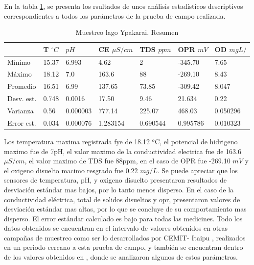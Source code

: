 En la tabla \ref{tab:datos Lago}, se presenta los rsultados de unos an\'alisis estadísticos descriptivos correspondientes a todos los par\'ametros de la prueba de campo realizada.

\begin{table}[H]
\caption{Muestreo lago Ypakarai. Resumen}
\label{tab:datos Lago}
\begin{tabular}{lllllll} \hline& 
T  $^{\circ}C$ & $pH$     & CE $\mu S/cm$ & TDS $ppm$ & OPR $mV$ & OD $mgL/$  \\ \hline
M\'inimo & 15.37 & 6.993 & 4.62 & 2    & -345.70  & 7.65     \\
M\'aximo & 18.12 & 7.0   & 163.6    & 88    & -269.10  & 8.43 \\
Promedio & 16.51  & 6.99 & 137.65 & 73.85 & -309.42  & 8.047 \\
Desv. est. & 0.748 & 0.0016   & 17.50   & 9.46     & 21.634   & 0.22     \\
Varianza                & 0.56           & 0.000003 & 777.14        & 225.07    & 468.03   & 0.050296 \\
Error est.               & 0.034 & 0.000076 & 1.283154 & 0.690544 & 0.995786 & 0.010323 \\
\hline
\end{tabular}
\end{table}
Los temperatura maxima registrada fye de 18.12 $^o$C, el potencial de hidrigeno maximo fue de 7pH, el valor maximo de la conductividad electrica fue de 163.6 $\mu S/cm$, el valor maximo de TDS fue 88ppm, en el caso de OPR fue -269.10 $mV$ y el oxigeno disuelto macimo resgrado fue 0.22 $mg/L$.
Se puede apreciar que los sensores de temperatura, pH, y oxigeno disuelto presentaron resultados de desviación estándar mas bajos, por lo tanto menos disperso. En el caso de la conductividad eléctrica, total de solidos disueltos y opr, presentaron valores de desviación estándar mas altas, por lo que se concluye de su comportamiento mas disperso.
El error estándar calculado es bajo para todas las medicines. 
Todo los datos obtenidos se encuentran en el intervalo de valores obtenidos en otras campa\~nas de muestreo como ser lo desarrollados por CEMIT- Itaipu \cite{3er_Cemit}\cite{4to_Cemit}, realizados en un periodo cercano a esta prueba de campo, y también se encuentran dentro de los valores obtenidos en \cite{lopez_moreira_m_eutrophication_2018}, donde se analizaron algunos de estos parámetros.  

